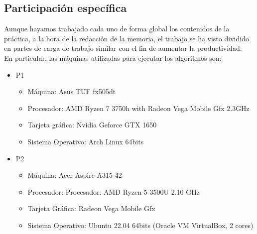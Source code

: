\documentclass{article}
\begin{document}
    \subsection{Participación específica}
    Aunque hayamos trabajado cada uno de forma global los contenidos de la práctica, a la hora de la redacción de la memoria, el trabajo se ha visto dividido en partes de carga de trabajo similar con el fin de aumentar la productividad.
    \\
    En particular, las máquinas utilizadas para ejecutar los algoritmos son:
    \begin{itemize}
        \item P1
        \begin{itemize}
                \item Máquina: Asus TUF fx505dt
                \item Procesador: AMD Ryzen 7 3750h with Radeon Vega Mobile Gfx 2.3GHz
                \item Tarjeta gráfica: Nvidia Geforce GTX 1650
                \item Sistema Operativo: Arch Linux 64bits
        \end{itemize}

        \item P2
        \begin{itemize}

                \item Máquina: Acer Aspire A315-42
                \item Procesador: Procesador: AMD Ryzen 5 3500U 2.10 GHz
                \item Tarjeta Gráfica: Radeon Vega Mobile Gfx
                \item Sistema Operativo: Ubuntu 22.04 64bits (Oracle VM VirtualBox, 2 cores)
                        \end{itemize}


\end{itemize}
\end{document}
